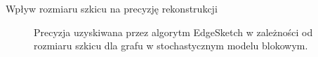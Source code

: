 \begin{frame}[squeeze]{Wpływ rozmiaru szkicu na precyzję rekonstrukcji}

    \begin{figure}[H]
        \centering
        \begin{minipage}[t]{0.9\textwidth}
            \centering
            \caption{Precyzja uzyskiwana przez algorytm EdgeSketch w zależności od rozmiaru szkicu dla grafu w stochastycznym modelu blokowym.}
        \end{minipage}
    \end{figure} 
\end{frame}